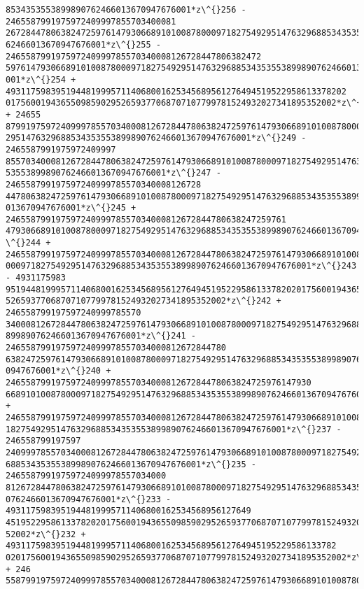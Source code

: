 \documentclass[11pt]{article}
\begin{document}
\begin{tcolorbox}[breakable, size=fbox, boxrule=.5pt, pad at break*=1mm, opacityfill=0]
\begin{Verbatim}[commandchars=\\\{\}]
8534353553899890762466013670947676001*z\^{}256 - 2465587991975972409997855703400081
26728447806382472597614793066891010087800097182754929514763296885343535538998907
62466013670947676001*z\^{}255 - 246558799197597240999785570340008126728447806382472
59761479306689101008780009718275492951476329688534353553899890762466013670947676
001*z\^{}254 + 49311759839519448199957114068001625345689561276494519522958613378202
017560019436550985902952659377068707107799781524932027341895352002*z\^{}253 + 24655
87991975972409997855703400081267284478063824725976147930668910100878000971827549
2951476329688534353553899890762466013670947676001*z\^{}249 - 2465587991975972409997
85570340008126728447806382472597614793066891010087800097182754929514763296885343
53553899890762466013670947676001*z\^{}247 - 246558799197597240999785570340008126728
44780638247259761479306689101008780009718275492951476329688534353553899890762466
013670947676001*z\^{}245 + 24655879919759724099978557034000812672844780638247259761
479306689101008780009718275492951476329688534353553899890762466013670947676001*z
\^{}244 + 2465587991975972409997855703400081267284478063824725976147930668910100878
0009718275492951476329688534353553899890762466013670947676001*z\^{}243 - 4931175983
95194481999571140680016253456895612764945195229586133782020175600194365509859029
52659377068707107799781524932027341895352002*z\^{}242 + 246558799197597240999785570
34000812672844780638247259761479306689101008780009718275492951476329688534353553
899890762466013670947676001*z\^{}241 - 24655879919759724099978557034000812672844780
63824725976147930668910100878000971827549295147632968853435355389989076246601367
0947676001*z\^{}240 + 2465587991975972409997855703400081267284478063824725976147930
6689101008780009718275492951476329688534353553899890762466013670947676001*z\^{}239
+ 246558799197597240999785570340008126728447806382472597614793066891010087800097
18275492951476329688534353553899890762466013670947676001*z\^{}237 - 246558799197597
24099978557034000812672844780638247259761479306689101008780009718275492951476329
688534353553899890762466013670947676001*z\^{}235 - 24655879919759724099978557034000
81267284478063824725976147930668910100878000971827549295147632968853435355389989
0762466013670947676001*z\^{}233 - 4931175983951944819995711406800162534568956127649
45195229586133782020175600194365509859029526593770687071077997815249320273418953
52002*z\^{}232 + 493117598395194481999571140680016253456895612764945195229586133782
02017560019436550985902952659377068707107799781524932027341895352002*z\^{}231 + 246
55879919759724099978557034000812672844780638247259761479306689101008780009718275

\end{Verbatim}
\end{tcolorbox}
\end{document}
